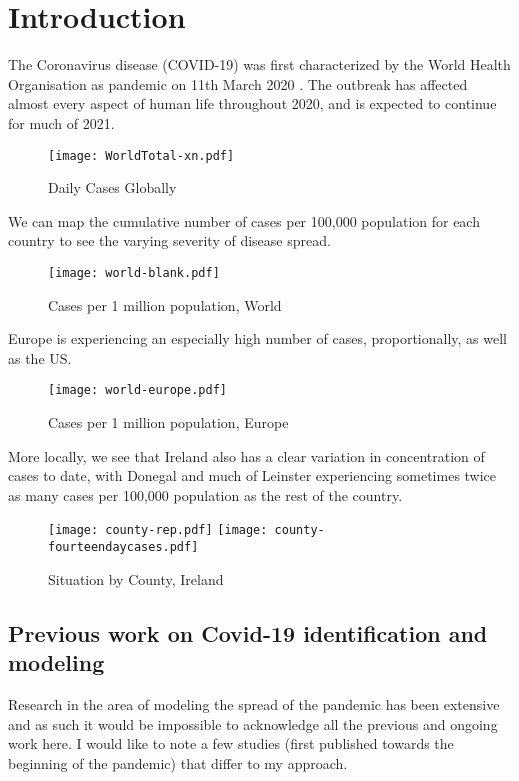 \section{Introduction}
\label{ch:intro}

The Coronavirus disease (COVID-19) was first characterized by the World Health Organisation as pandemic on 11th March 2020 \cite{whodeclare20}. The outbreak has affected almost every aspect of human life throughout 2020, and is expected to continue for much of 2021. 

\begin{figure}[H]
\texttt{[image: WorldTotal-xn.pdf]}
\caption{Daily Cases Globally}
\end{figure}

We can map the cumulative number of cases per 100,000 population for each country to see the varying severity of disease spread. 

\begin{figure}[H]
\texttt{[image: world-blank.pdf]}
\caption{Cases per 1 million population, World}
\end{figure}

Europe is experiencing an especially high number of cases, proportionally, as well as the US.

\begin{figure}[H]
\texttt{[image: world-europe.pdf]}
\caption{Cases per 1 million population,  Europe}
\end{figure}

More locally, we see that Ireland also has a clear variation in concentration of cases to date, with Donegal and much of Leinster experiencing sometimes twice as many cases per 100,000 population as the rest of the country.

\begin{figure}[H]
\texttt{[image: county-rep.pdf]}
\endminipage\hfill
{}
\texttt{[image: county-fourteendaycases.pdf]}
\endminipage
\caption{Situation by County, Ireland}
\end{figure}

\subsection{Previous work on Covid-19 identification and modeling}
Research in the area of modeling the spread of the pandemic has been extensive and as such it would be impossible to acknowledge all the previous and ongoing work here. I would like to note a few studies (first published towards the beginning of the pandemic) that differ to my approach.

